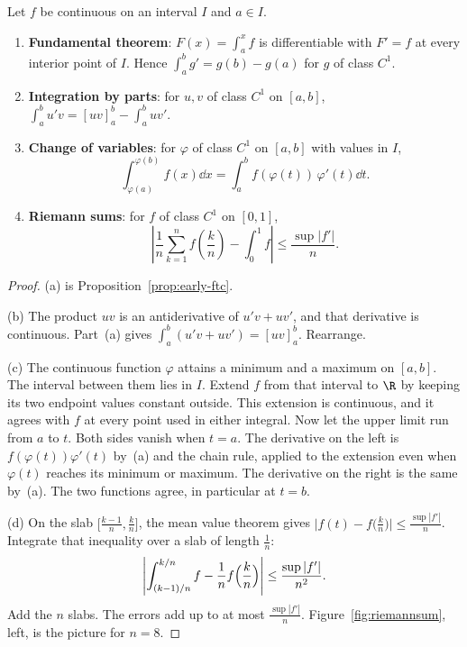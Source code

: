 \begin{proposition}\label{prop:inttools}
Let $f$ be continuous on an interval $I$ and $a\in I$.
\begin{enumerate}[label=(\alph*)]
\item \textbf{Fundamental theorem}: $F(x)=\int_a^xf$ is differentiable with $F'=f$ at every interior point of $I$. Hence $\int_a^bg'=g(b)-g(a)$ for $g$ of class $C^1$.
\item \textbf{Integration by parts}: for $u,v$ of class $C^1$ on $[a,b]$, $\int_a^bu'v=[uv]_a^b-\int_a^buv'$.
\item \textbf{Change of variables}: for $\varphi$ of class $C^1$ on $[a,b]$ with values in $I$,
\[\int_{\varphi(a)}^{\varphi(b)}f(x)\dd x=\int_a^bf(\varphi(t))\,\varphi'(t)\dd t.\]
\item \textbf{Riemann sums}: for $f$ of class $C^1$ on $[0,1]$,
\[\left|\frac1n\sum_{k=1}^nf\left(\frac kn\right)-\int_0^1f\right|\le\frac{\sup|f'|}{n}.\]
\end{enumerate}
\end{proposition}
\begin{proof}
(a) is Proposition~\ref{prop:early-ftc}.

(b) The product $uv$ is an antiderivative of $u'v+uv'$, and that derivative is continuous. Part~(a) gives $\int_a^b(u'v+uv')=[uv]_a^b$. Rearrange.

(c) The continuous function $\varphi$ attains a minimum and a maximum on $[a,b]$. The interval between them lies in $I$. Extend $f$ from that interval to $\R$ by keeping its two endpoint values constant outside. This extension is continuous, and it agrees with $f$ at every point used in either integral. Now let the upper limit run from $a$ to $t$. Both sides vanish when $t=a$. The derivative on the left is $f(\varphi(t))\varphi'(t)$ by~(a) and the chain rule, applied to the extension even when $\varphi(t)$ reaches its minimum or maximum. The derivative on the right is the same by~(a). The two functions agree, in particular at $t=b$.

(d) On the slab $\bigl[\frac{k-1}n,\frac kn\bigr]$, the mean value theorem gives $\bigl|f(t)-f\bigl(\frac kn\bigr)\bigr|\le\frac{\sup|f'|}n$. Integrate that inequality over a slab of length $\frac1n$:
\[
\left|\int_{(k-1)/n}^{k/n}f-\frac1n f\Bigl(\frac kn\Bigr)\right|\le\frac{\sup|f'|}{n^2}.
\]
Add the $n$ slabs. The errors add up to at most $\frac{\sup|f'|}n$. Figure~\ref{fig:riemannsum}, left, is the picture for $n=8$.
\end{proof}


